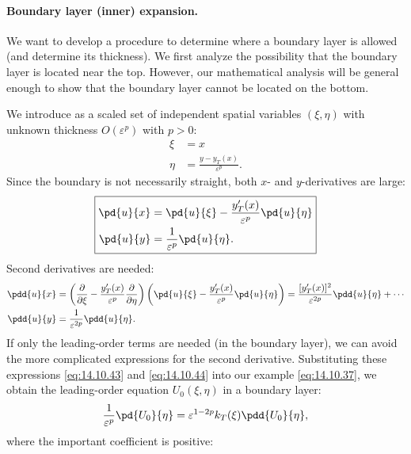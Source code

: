 \paragraph{Boundary layer (inner) expansion.}
We want to develop a procedure to determine where a boundary layer is allowed (and determine its thickness). We first analyze the possibility that the boundary layer is located near the top. However, our mathematical analysis will be general enough to show that the boundary layer cannot be located on the bottom.

We introduce as a scaled set of independent spatial variables $(\xi, \eta)$ with unknown thickness $O(\varepsilon^p)$ with $p > 0$:
\begin{equation}
\boxed{\begin{aligned}
\xi &= x \\
\eta &= \frac{y - y_T(x)}{\varepsilon^p}.
\end{aligned}}
\label{eq:14.10.42}
\end{equation}
Since the boundary is not necessarily straight, both $x$- and $y$-derivatives are large:
\begin{equation}
\boxed{\begin{aligned}
\pd{u}{x} &= \pd{u}{\xi} - \frac{y_T'(x)}{\varepsilon^p}\pd{u}{\eta} \\
\pd{u}{y} &= \frac{1}{\varepsilon^p}\pd{u}{\eta}.
\end{aligned}}
\end{equation}
Second derivatives are needed:
\begin{align}
\pdd{u}{x} &= \left(\frac{\partial}{\partial \xi} - \frac{y_T'(x)}{\varepsilon^p}\frac{\partial}{\partial \eta}\right)\left(\pd{u}{\xi} - \frac{y_T'(x)}{\varepsilon^p}\pd{u}{\eta}\right) = \frac{[y_T'(x)]^2}{\varepsilon^{2p}}\pdd{u}{\eta} + \cdots \label{eq:14.10.43} \\
\pdd{u}{y} &= \frac{1}{\varepsilon^{2p}}\pdd{u}{\eta}. \label{eq:14.10.44}
\end{align}
If only the leading-order terms are needed (in the boundary layer), we can avoid the more complicated expressions for the second derivative. Substituting these expressions \eqref{eq:14.10.43} and \eqref{eq:14.10.44} into our example \eqref{eq:14.10.37}, we obtain the leading-order equation $U_0(\xi, \eta)$ in a boundary layer:
\begin{equation}
\frac{1}{\varepsilon^p}\pd{U_0}{\eta} = \varepsilon^{1-2p} k_T(\xi)\pdd{U_0}{\eta},
\label{eq:14.10.45}
\end{equation}
where the important coefficient is positive:

